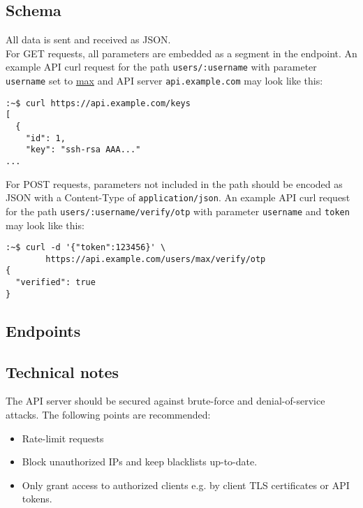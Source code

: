 \subsection{Schema}

All data is sent and received as JSON. \\

For GET requests, all parameters are embedded as a segment in the endpoint. An
example API curl request for the path \verb+users/:username+ with parameter
\verb+username+ set to \underline{max} and API server \verb+api.example.com+
may look like this:

\begin{lstlisting}[language=none, numbers=none]
:~$ curl https://api.example.com/keys
[
  {
    "id": 1,
    "key": "ssh-rsa AAA..."
...
\end{lstlisting}

For POST requests, parameters not included in the path should be encoded as JSON
with a Content-Type of \verb+application/json+. An example API curl request for
the path \verb+users/:username/verify/otp+ with parameter \verb+username+ and
\verb+token+ may look like this:

\begin{lstlisting}[language=none, numbers=none]
:~$ curl -d '{"token":123456}' \
        https://api.example.com/users/max/verify/otp
{
  "verified": true
}
\end{lstlisting}


\subsection{Endpoints}

\newcommand{\includeApiDefinition}[1]{
	\begin{minipage}{\textwidth}
	
	\end{minipage}
}


\includeApiDefinition{ssh_keys}
\includeApiDefinition{ssh_keys_notify}
\includeApiDefinition{verify_otp}


\subsection{Technical notes}

The API server should be secured against brute-force and denial-of-service
attacks. The following points are recommended:

\begin{itemize}
	\item Rate-limit requests
	\item Block unauthorized IPs and keep blacklists up-to-date.
	\item Only grant access to authorized clients e.g. by client TLS
		certificates or API tokens.
\end{itemize}
